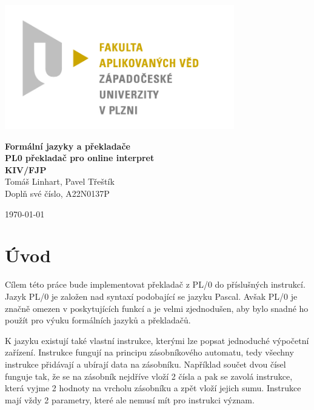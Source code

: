 \documentclass[12pt, letterpaper]{article}
\begin{document}
\begin{titlepage}
\centerline{\includegraphics[width=10cm]{img/logo.jpg}}
\begin{center}
\vspace{30px}
{\huge
\textbf{Formální jazyky a překladače}\\
\textbf{PL0 překladač pro online interpret}\\
\vspace{1cm}
}
{\large
\textbf{KIV/FJP}\\
\vspace{1cm}
}
\vspace{1cm}
{\large
Tomáš Linhart, Pavel Třeštík\\
}
{\normalsize
Doplň své číslo, A22N0137P
}
\end{center}
\vspace{\fill}
\hfill
\begin{minipage}[t]{7cm}
\flushright
\today
\end{minipage}
\end{titlepage}
\section{Úvod}
Cílem této práce bude implementovat překladač z  PL/0 do příslušných instrukcí. Jazyk PL/0
je založen nad syntaxí podobající se jazyku Pascal. Avšak PL/0 je značně omezen v poskytujících funkcí a je velmi 
zjednodušen, aby bylo snadné ho použít pro výuku formálních jazyků a překladačů.

K jazyku existují také vlastní instrukce, kterými lze popsat jednoduché výpočetní zařízení. Instrukce fungují na 
principu zásobníkového automatu, tedy všechny instrukce přidávají a ubírají data na zásobníku. Například součet dvou
čísel funguje tak, že se na zásobník nejdříve vloží 2 čísla a pak se zavolá instrukce, která vyjme 2 hodnoty na vrcholu
zásobníku a zpět vloží jejich sumu. Instrukce mají vždy 2 parametry, které ale nemusí mít pro instrukci význam.
\end{document}
